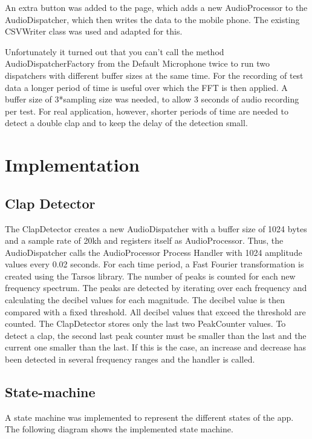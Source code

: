 An extra button was added to the page, which adds a new AudioProcessor to the
AudioDispatcher, which then writes the data to the mobile phone. The existing
CSVWriter class was used and adapted for this.

Unfortunately it turned out that you can't call the method
AudioDispatcherFactory from the Default Microphone twice to run two dispatchers with
different buffer sizes at the same time. For the recording of test data a longer
period of time is useful over which the FFT is then applied. A buffer size of
3*sampling size was needed, to allow 3 seconds of audio recording per test. For
real application, however, shorter periods of time are needed to detect a double
clap and to keep the delay of the detection small.


\section{Implementation}
\label{sec:org7c927b3}
\subsection{Clap Detector}

The ClapDetector creates a new AudioDispatcher with a buffer size of 1024 bytes and a sample rate of 20kh and registers itself as AudioProcessor.
Thus, the AudioDispatcher calls the AudioProcessor Process Handler with 1024 amplitude values every 0.02 seconds.
For each time period, a Fast Fourier transformation is created using the Tarsos library. The number of peaks is counted for each new frequency spectrum.
The peaks are detected by iterating over each frequency and calculating the decibel values for each magnitude. The decibel value is then compared with a fixed threshold.
All decibel values that exceed the threshold are counted. The ClapDetector stores only the last two PeakCounter values.
To detect a clap, the second last peak counter must be smaller than the last and the current one smaller than the last.
If this is the case, an increase and decrease has been detected in several frequency ranges and the handler is called.


\subsection{State-machine}
\label{sec:orgd3a5b2d}
A state machine was implemented to represent the different states of the app.
The following diagram shows the implemented state machine.

